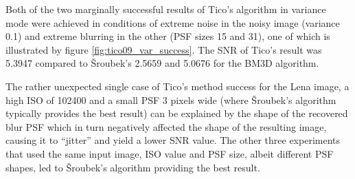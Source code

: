 \documentclass[12pt,notitlepage]{report}
\begin{document}
Both of the two marginally successful results of Tico's algorithm in variance mode were achieved in conditions of extreme noise in the noisy image (variance 0.1) and extreme blurring in the other (PSF sizes 15 and 31), one of which is illustrated by figure \ref{fig:tico09_var_success}. The SNR of Tico's result was 5.3947 compared to Šroubek's 2.5659 and 5.0676 for the BM3D algorithm.

The rather unexpected single case of Tico's method success for the Lena image, a high ISO of 102400 and a small PSF 3 pixels wide (where Šroubek's algorithm typically provides the best result) can be explained by the shape of the recovered blur PSF which in turn negatively affected the shape of the resulting image, causing it to ``jitter'' and yield a lower SNR value. The other three experiments that used the same input image, ISO value and PSF size, albeit different PSF shapes, led to Šroubek's algorithm providing the best result.   
\end{document}
